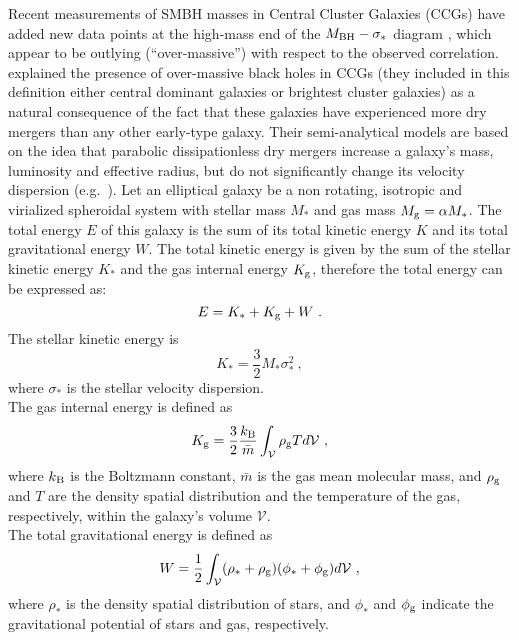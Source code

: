 Recent measurements of SMBH masses in Central Cluster Galaxies (CCGs)
have added new data points at the high-mass end of the 
$M_{\rm BH} - \sigma_*$ diagram \citep{mcconnell2011,mcconnell2012}, 
which appear to be outlying (``over-massive'') with respect to the observed correlation. 
\citet{volontericiotti2013} explained the presence of over-massive black holes in CCGs 
(they included in this definition either central dominant galaxies or brightest cluster galaxies) 
as a natural consequence of the fact that these galaxies have experienced more dry mergers 
than any other early-type galaxy. 
Their semi-analytical models are based on the idea that parabolic dissipationless dry mergers 
increase a galaxy's mass, luminosity and effective radius, 
but do not significantly change its velocity dispersion (e.g.~\citealt{ciotti2007}). 
Let an elliptical galaxy be a non rotating, isotropic and virialized spheroidal system 
with stellar mass $M_{*}$ and gas mass $M_{\rm g} = \alpha M_{*}$. 
The total energy $E$ of this galaxy is the sum of its total kinetic energy $K$ and its total gravitational energy $W$. 
The total kinetic energy is given by the sum of the stellar kinetic energy $K_*$ and the gas internal energy $K_{\rm g}$, 
therefore the total energy can be expressed as:
\begin{equation}
E = K_* + K_{\rm g} + W \ .
\end{equation}
The stellar kinetic energy is 
\begin{equation}
K_* = \frac{3}{2} M_* \sigma_*^2 \ ,
\end{equation}
where $\sigma_*$ is the stellar velocity dispersion. \\
The gas internal energy is defined as 
\begin{equation}
K_{\rm g} = \frac{3}{2} \frac{k_{\rm B}}{\bar{m} } \int_{\mathcal{V}} \rho_{\rm g} T d\mathcal{V} \ ,
\end{equation}
where $k_{\rm B}$ is the Boltzmann constant, $\bar{m}$ is the gas mean molecular mass, and 
$\rho_{\rm g}$ and $T$ are the density spatial distribution and the temperature of the gas, respectively, 
within the galaxy's volume $\mathcal{V}$. \\
The total gravitational energy is defined as 
\begin{equation}
W = \frac{1}{2} \int_{\mathcal{V}} (\rho_* + \rho_{\rm g}) (\phi_* + \phi_{\rm g}) d\mathcal{V} \ , 
\end{equation}
where $\rho_*$ is the density spatial distribution of stars, 
and $\phi_*$ and $\phi_{\rm g}$ indicate the gravitational potential of stars and gas, respectively. \\

